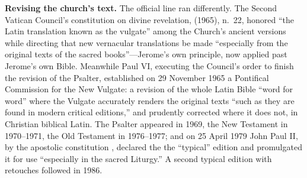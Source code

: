 \textbf{Revising the church's text.} The official line ran differently.
The Second Vatican Council's constitution on divine revelation,
 (1965), n.~22, honored ``the Latin translation known
as the vulgate'' among the Church's ancient versions while directing
that new vernacular translations be made ``especially from the original
texts of the sacred books''---Jerome's own principle, now applied past
Jerome's own Bible. Meanwhile Paul VI, executing the Council's order to
finish the revision of the Psalter, established on 29 November 1965 a
Pontifical Commission for the New Vulgate: a revision of the whole Latin
Bible ``word for word'' where the Vulgate accurately renders the
original texts ``such as they are found in modern critical editions,''
and prudently corrected where it does not, in Christian biblical Latin.
The Psalter appeared in 1969, the New Testament in 1970--1971, the Old
Testament in 1976--1977; and on 25 April 1979 John Paul II, by the
apostolic constitution , declared the
 the ``typical'' edition and promulgated it for use
``especially in the sacred Liturgy.'' A second typical edition with
retouches followed in 1986.

